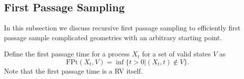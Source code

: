\documentclass[a4paper,12pt]{article}
\begin{document}

\subsection{First Passage Sampling}

In this subsection we discuss recursive first passage sampling to efficiently
first passage sample complicated geometries with an arbitrary starting point.


\begin{definition} \label{def:first passage time}
  Define the first passage time for a process $X_{t}$ for a set of valid states
  $V$ as
  \begin{equation}
    \text{FPt}(X_{t},V)=\inf \{t>0| (X_{t},t) \notin V \}
    .
  \end{equation}
  Note that the first passage time is a RV itself.
\end{definition}
\end{document}

